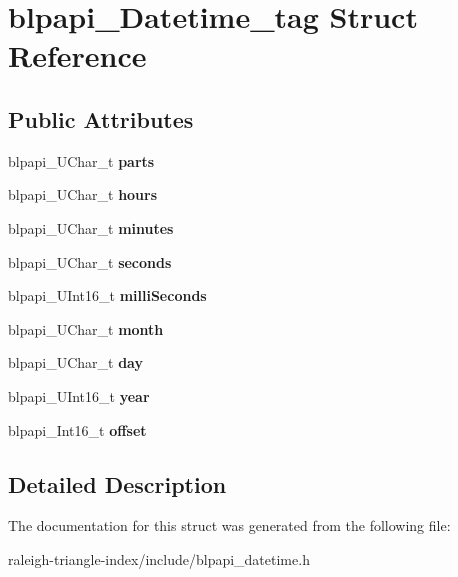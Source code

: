 \section{blpapi\+\_\+\+Datetime\+\_\+tag Struct Reference}
\label{structblpapi___datetime__tag}
\subsection*{Public Attributes}
\begin{DoxyCompactItemize}
\item 
blpapi\+\_\+\+U\+Char\+\_\+t {\bfseries parts}\label{structblpapi___datetime__tag_afc7e10f10f66a3ba2a633ea6e5159f32}

\item 
blpapi\+\_\+\+U\+Char\+\_\+t {\bfseries hours}\label{structblpapi___datetime__tag_a086de25506d9608b81b646899ef49bb5}

\item 
blpapi\+\_\+\+U\+Char\+\_\+t {\bfseries minutes}\label{structblpapi___datetime__tag_afebdd321673ae23b017cf038c5e039e6}

\item 
blpapi\+\_\+\+U\+Char\+\_\+t {\bfseries seconds}\label{structblpapi___datetime__tag_a67495f8ba256bc97aaf5a2ae08bad645}

\item 
blpapi\+\_\+\+U\+Int16\+\_\+t {\bfseries milli\+Seconds}\label{structblpapi___datetime__tag_a380bba06b9ccefacfd679480e3373780}

\item 
blpapi\+\_\+\+U\+Char\+\_\+t {\bfseries month}\label{structblpapi___datetime__tag_a11318966911210526d5f5a8465785822}

\item 
blpapi\+\_\+\+U\+Char\+\_\+t {\bfseries day}\label{structblpapi___datetime__tag_a03ef3fef126d8056e584317848b0791b}

\item 
blpapi\+\_\+\+U\+Int16\+\_\+t {\bfseries year}\label{structblpapi___datetime__tag_a1860a800fe40ad608105be2ad1b1ec8a}

\item 
blpapi\+\_\+\+Int16\+\_\+t {\bfseries offset}\label{structblpapi___datetime__tag_ac85c4f85aedce40d1992f377ba3e8445}

\end{DoxyCompactItemize}


\subsection{Detailed Description}


The documentation for this struct was generated from the following file\+:\begin{DoxyCompactItemize}
\item 
raleigh-\/triangle-\/index/include/blpapi\+\_\+datetime.\+h\end{DoxyCompactItemize}
